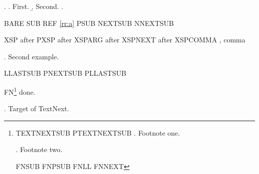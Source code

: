 

\ex.\label{rr:one}
\a. First.
\b. Second.
\z.

BARE \Last{} SUB \Last[b] REF \ref{rr:a} PSUB \pLast[b]
NEXTSUB \Next[c] NNEXTSUB \NNext[d]

XSP \Last after PXSP \pLast after XSPARG \Last[b] after
XSPNEXT \Next after XSPCOMMA \Last, comma

\ex. Second example.

LLASTSUB \LLast[a] PNEXTSUB \pNext[e] PLLASTSUB \pLLast[f]

FN\footnote{TEXTNEXTSUB \TextNext[a] PTEXTNEXTSUB \pTextNext[b]
\ex. Footnote one.

\ex. Footnote two.

FNSUB \Last[a] FNPSUB \pLast[a] FNLL \LLast[b] FNNEXT \Next[c]} done.

\ex. Target of TextNext.

